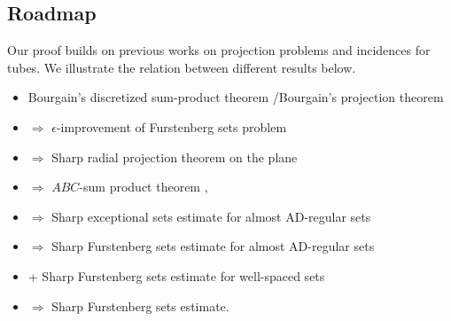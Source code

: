 \documentclass{amsart}
\begin{document}
\subsection{Roadmap}\label{section: roadmap}
Our proof builds on previous works on projection problems and incidences for tubes. We illustrate the relation between different results below. 
\begin{itemize}[,]
    \item Bourgain's discretized sum-product theorem \cite{bourgain2003erdHos}/Bourgain's projection theorem \cite{bourgain2010discretized}
    \item $\Longrightarrow$ $\epsilon$-improvement of Furstenberg sets problem \cite{orponen2021hausdorff}
    \item $\Longrightarrow$ Sharp radial projection theorem on the plane \cite{orponen2022kaufman} 
    \item $\Longrightarrow$ $ABC$-sum product theorem \cite{orponen2023projections}, \cite{eberhard2023ABC}
    \item $\Longrightarrow$ Sharp exceptional sets estimate for almost AD-regular sets \cite{orponen2023projections}
    \item $\Longrightarrow$ Sharp Furstenberg sets estimate for almost AD-regular sets \cite{orponen2023projections}
    \item + Sharp Furstenberg sets estimate for well-spaced sets \cite{guth2019incidence}
    \item $\Longrightarrow$ Sharp Furstenberg sets estimate.
\end{itemize}






\end{document}
